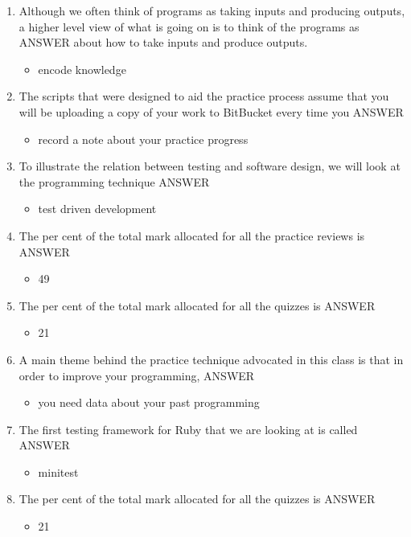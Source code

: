 \documentclass{exam}
\begin{document}
\begin{enumerate}
\item Although we often think of programs as taking inputs and producing outputs, a higher level view of what is going on is to think of the programs as ANSWER about how to take inputs and produce outputs.
\begin{itemize}
\item encode knowledge
\end{itemize}
\item The scripts that were designed to aid the practice process assume that you will be uploading a copy of your work to BitBucket every time you ANSWER
\begin{itemize}
\item record a note about your practice progress
\end{itemize}
\item To illustrate the relation between testing and software design, we will look at the programming technique ANSWER
\begin{itemize}
\item test driven development
\end{itemize}
\item The per cent of the total mark allocated for all the practice reviews is ANSWER
\begin{itemize}
\item 49
\end{itemize}
\item The per cent of the total mark allocated for all the quizzes is ANSWER
\begin{itemize}
\item 21
\end{itemize}
\item A main theme behind the practice technique advocated in this class is that in order to improve your programming, ANSWER
\begin{itemize}
\item you need data about your past programming
\end{itemize}
\item The first testing framework for Ruby that we are looking at is called ANSWER
\begin{itemize}
\item minitest
\end{itemize}
\item The per cent of the total mark allocated for all the quizzes is ANSWER
\begin{itemize}
\item 21

\end{itemize}
\end{enumerate}
\end{document}
